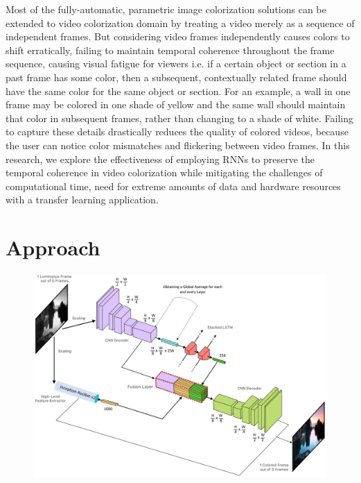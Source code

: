 \documentclass[10pt,twocolumn,letterpaper]{article}
\begin{document}
Most of the fully-automatic, parametric image colorization solutions can be extended to video colorization domain by treating a video merely as a sequence of independent frames. But considering video frames independently causes colors to shift erratically, failing to maintain temporal coherence throughout the frame sequence, causing visual fatigue for viewers i.e. if a certain object or section in a past frame has some color, then a subsequent, contextually related frame should have the same color for the same object or section. For an example, a wall in one frame may be colored in one shade of yellow and the same wall should maintain that color in subsequent frames, rather than changing to a shade of white. Failing to capture these details drastically reduces the quality of colored videos, because the user can notice color mismatches and flickering between video frames. In this research, we explore the effectiveness of employing RNNs to preserve the temporal coherence in video colorization while mitigating the challenges of computational time, need for extreme amounts of data and hardware resources with a transfer learning application.

\section{Approach}

\begin{figure}
	\includegraphics[width=\textwidth]{flowchroma-architecture.png}
\end{figure}
\end{document}
